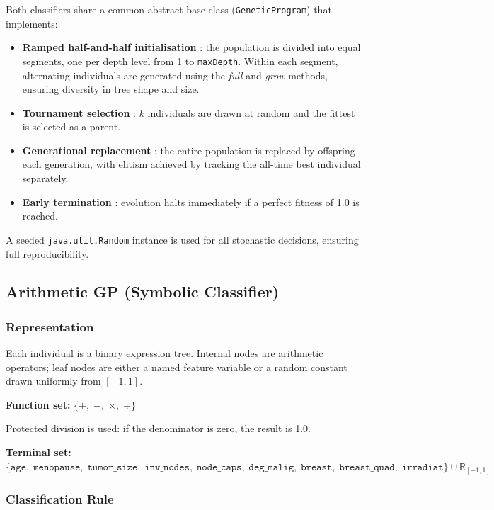 \documentclass[12pt,a4paper]{article}
\begin{document}
Both classifiers share a common abstract base class (\texttt{GeneticProgram}) that implements:

\begin{itemize}
    \item \textbf{Ramped half-and-half initialisation} : the population is divided into equal segments, one per depth level from 1 to \texttt{maxDepth}. Within each segment, alternating individuals are generated using the \emph{full} and \emph{grow} methods, ensuring diversity in tree shape and size.
    \item \textbf{Tournament selection} : $k$ individuals are drawn at random and the fittest is selected as a parent.
    \item \textbf{Generational replacement} : the entire population is replaced by offspring each generation, with elitism achieved by tracking the all-time best individual separately.
    \item \textbf{Early termination} : evolution halts immediately if a perfect fitness of 1.0 is reached.
\end{itemize}

A seeded \texttt{java.util.Random} instance is used for all stochastic decisions, ensuring full reproducibility.

\subsection{Arithmetic GP (Symbolic Classifier)}

\subsubsection{Representation}

Each individual is a binary expression tree. Internal nodes are arithmetic operators; leaf nodes are either a named feature variable or a random constant drawn uniformly from $[-1, 1]$.

\textbf{Function set:} $\{+,\;-,\;\times,\;\div\}$

Protected division is used: if the denominator is zero, the result is 1.0.

\textbf{Terminal set:} $\{\texttt{age},\;\texttt{menopause},\;\texttt{tumor\_size},\;\texttt{inv\_nodes},\;\texttt{node\_caps},\;\texttt{deg\_malig},\;\texttt{breast},\;\texttt{breast\_quad},\;\texttt{irradiat}\} \cup \mathbb{R}_{[-1,1]}$

\subsubsection{Classification Rule}
\end{document}
